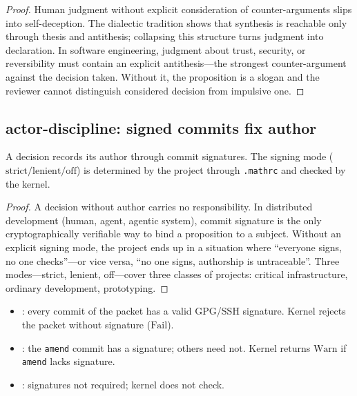 \begin{proof}
Human judgment without explicit consideration of counter-arguments
slips into self-deception. The dialectic tradition shows that
synthesis is reachable only through thesis and antithesis; collapsing
this structure turns judgment into declaration. In software
engineering, judgment about trust, security, or reversibility must
contain an explicit antithesis---the strongest counter-argument
against the decision taken. Without it, the proposition is a slogan
and the reviewer cannot distinguish considered decision from
impulsive one.
\end{proof}

\subsection{actor-discipline: signed commits fix author}

\begin{theorem}
A decision records its author through commit signatures. The signing
mode ($\mathrm{strict} / \mathrm{lenient} / \mathrm{off}$) is determined
by the project through \texttt{.mathrc} and checked by the kernel.
\end{theorem}

\begin{proof}
A decision without author carries no responsibility. In distributed
development (human, agent, agentic system), commit signature is the
only cryptographically verifiable way to bind a proposition to a
subject. Without an explicit signing mode, the project ends up in a
situation where ``everyone signs, no one checks''---or vice versa,
``no one signs, authorship is untraceable''. Three modes---strict,
lenient, off---cover three classes of projects: critical
infrastructure, ordinary development, prototyping.
\end{proof}

\begin{theorem}
\begin{itemize}
\item {}: every commit of the packet has a valid GPG/SSH
      signature. Kernel rejects the packet without signature
      ($\mathrm{Fail}$).
\item {}: the \texttt{amend} commit has a signature;
      others need not. Kernel returns $\mathrm{Warn}$ if \texttt{amend}
      lacks signature.
\item {}: signatures not required; kernel does not check.
\end{itemize}
\end{theorem}